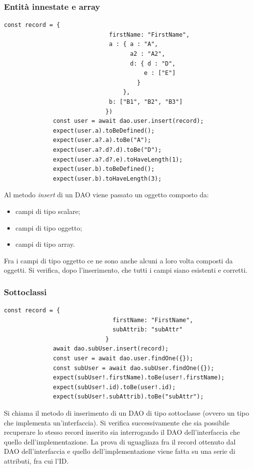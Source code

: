 \documentclass[a4paper, 12pt]{report}
\begin{document}
          \subsubsection{Entità innestate e array}
            \begin{Verbatim}[samepage=true]
              const record = {
                              firstName: "FirstName",
                              a : { a : "A",
                                    a2 : "A2",
                                    d: { d : "D",
                                        e : ["E"]
                                      }
                                  },
                              b: ["B1", "B2", "B3"]
                             })
              const user = await dao.user.insert(record);
              expect(user.a).toBeDefined();
              expect(user.a?.a).toBe("A");
              expect(user.a?.d?.d).toBe("D");
              expect(user.a?.d?.e).toHaveLength(1);
              expect(user.b).toBeDefined();
              expect(user.b).toHaveLength(3);
            \end{Verbatim}
            Al metodo \emph{insert} di un DAO viene passato un oggetto composto da:
            \begin{itemize}
              \item campi di tipo scalare;
              \item campi di tipo oggetto;
              \item campi di tipo array.
            \end{itemize}
            Fra i campi di tipo oggetto ce ne sono anche alcuni a loro volta composti da oggetti.
            Si verifica, dopo l'inserimento, che tutti i campi siano esistenti e corretti.
          \newpage
          \subsubsection{Sottoclassi}
            \begin{Verbatim}[samepage=true]
              const record = { 
                               firstName: "FirstName",
                               subAttrib: "subAttr"
                             }
              await dao.subUser.insert(record);
              const user = await dao.user.findOne({});
              const subUser = await dao.subUser.findOne({});
              expect(subUser!.firstName).toBe(user!.firstName);
              expect(subUser!.id).toBe(user!.id);
              expect(subUser!.subAttrib).toBe("subAttr");
            \end{Verbatim}
            Si chiama il metodo di inserimento di un DAO di tipo sottoclasse (ovvero un tipo che implementa un'interfaccia). Si verifica successivamente che sia possibile recuperare lo stesso record inserito sia interrogando il DAO dell'interfaccia che quello dell'implementazione. La prova di uguagliaza fra il record ottenuto dal DAO
            dell'interfaccia e quello dell'implementazione viene fatta su una serie di attributi, fra cui l'ID.
          \newpage
\end{document}
